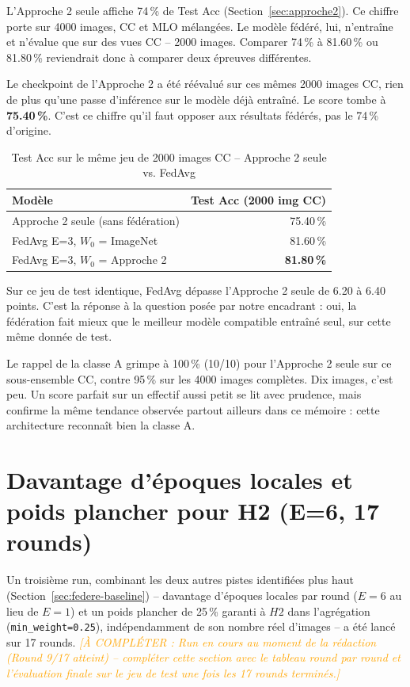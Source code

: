 \documentclass[12pt,a4paper]{report}
\newcommand{\todo}[1]{\textcolor{orange}{\textit{[À COMPLÉTER : #1]}}}
\begin{document}
L'Approche 2 seule affiche 74\,\% de Test Acc (Section~\ref{sec:approche2}).
Ce chiffre porte sur 4000 images, CC et MLO mélangées. Le modèle fédéré, lui,
n'entraîne et n'évalue que sur des vues CC -- 2000 images. Comparer 74\,\%
à 81.60\,\% ou 81.80\,\% reviendrait donc à comparer deux épreuves
différentes.

Le checkpoint de l'Approche 2 a été réévalué sur ces mêmes 2000 images CC,
rien de plus qu'une passe d'inférence sur le modèle déjà entraîné. Le score
tombe à \textbf{75.40\,\%}. C'est ce chiffre qu'il faut opposer aux résultats
fédérés, pas le 74\,\% d'origine.

\begin{table}[h]
\centering
\caption{Test Acc sur le même jeu de 2000 images CC -- Approche 2 seule vs. FedAvg}
\label{tab:federated_vs_approche2_cc}
\begin{tabular}{lr}
\toprule
Modèle & Test Acc (2000 img CC) \\
\midrule
Approche 2 seule (sans fédération) & 75.40\,\% \\
FedAvg E=3, $W_0$ = ImageNet & 81.60\,\% \\
FedAvg E=3, $W_0$ = Approche 2 & \textbf{81.80\,\%} \\
\bottomrule
\end{tabular}
\end{table}

Sur ce jeu de test identique, FedAvg dépasse l'Approche 2 seule de 6.20 à
6.40 points. C'est la réponse à la question posée par notre encadrant :
oui, la fédération fait mieux que le meilleur modèle compatible entraîné
seul, sur cette même donnée de test.

Le rappel de la classe A grimpe à 100\,\% (10/10) pour l'Approche 2 seule
sur ce sous-ensemble CC, contre 95\,\% sur les 4000 images complètes. Dix
images, c'est peu. Un score parfait sur un effectif aussi petit se lit avec
prudence, mais confirme la même tendance observée partout ailleurs dans ce
mémoire : cette architecture reconnaît bien la classe A.

\section{Davantage d'époques locales et poids plancher pour H2 (E=6, 17 rounds)}
\label{sec:federe-e6}

Un troisième run, combinant les deux autres pistes identifiées plus haut
(Section~\ref{sec:federe-baseline}) -- davantage d'époques locales par
round ($E{=}6$ au lieu de $E{=}1$) et un poids plancher de 25\,\% garanti à
$H2$ dans l'agrégation (\texttt{min\_weight=0.25}), indépendamment de son
nombre réel d'images -- a été lancé sur 17 rounds. \todo{Run en cours au
moment de la rédaction (Round 9/17 atteint) -- compléter cette section avec
le tableau round par round et l'évaluation finale sur le jeu de test une
fois les 17 rounds terminés.}
\end{document}
